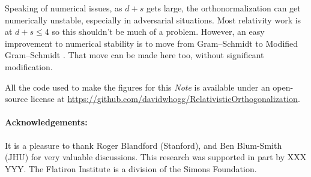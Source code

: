 \documentclass{article}
\newcommand{\documentname}{\textsl{Note}}
\begin{document}
Speaking of numerical issues, as $d+s$ gets large, the orthonormalization can get numerically unstable, especially in adversarial situations.
Most relativity work is at $d+s\leq 4$ so this shouldn't be much of a problem.
However, an easy improvement to numerical stability is to move from Gram--Schmidt to Modified Gram--Schmidt \cite{modifiedgramschmidt}.
That move can be made here too, without significant modification.

All the code used to make the figures for this \documentname{} is available under an open-source license at \url{https://github.com/davidwhogg/RelativisticOrthogonalization}.

\paragraph{Acknowledgements:}
It is a pleasure to thank
  Roger Blandford (Stanford), and
  Ben Blum-Smith (JHU)
for very valuable discussions.
This research was supported in part by XXX YYY.
The Flatiron Institute is a division of the Simons Foundation.

\raggedright


\end{document}
